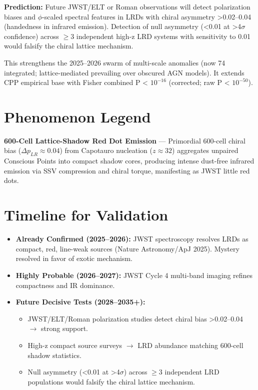 \documentclass[11pt]{article}
\begin{document}
\textbf{Prediction:} Future JWST/ELT or Roman observations will detect polarization biases and $\phi$-scaled spectral features in LRDs with chiral asymmetry >0.02--0.04 (handedness in infrared emission). Detection of null asymmetry (<0.01 at >4$\sigma$ confidence) across $\geq 3$ independent high-z LRD systems with sensitivity to 0.01 would falsify the chiral lattice mechanism.

This strengthens the 2025--2026 swarm of multi-scale anomalies (now 74 integrated; lattice-mediated prevailing over obscured AGN models). It extends CPP empirical base with Fisher combined P < $10^{-16}$ (corrected; raw P < $10^{-50}$).

\section{Phenomenon Legend}
\textbf{600-Cell Lattice-Shadow Red Dot Emission} — Primordial 600-cell chiral bias ($\Delta p_{LR} \approx 0.04$) from Capotauro nucleation ($z \approx 32$) aggregates unpaired Conscious Points into compact shadow cores, producing intense dust-free infrared emission via SSV compression and chiral torque, manifesting as JWST little red dots.

\section{Timeline for Validation}
\begin{itemize}
    \item \textbf{Already Confirmed (2025--2026):} JWST spectroscopy resolves LRDs as compact, red, line-weak sources (Nature Astronomy/ApJ 2025). Mystery resolved in favor of exotic mechanism.
    \item \textbf{Highly Probable (2026--2027):} JWST Cycle 4 multi-band imaging refines compactness and IR dominance.
    \item \textbf{Future Decisive Tests (2028--2035+):}
    \begin{itemize}
        \item JWST/ELT/Roman polarization studies detect chiral bias >0.02--0.04 $\to$ strong support.
        \item High-z compact source surveys $\to$ LRD abundance matching 600-cell shadow statistics.
        \item Null asymmetry (<0.01 at >4$\sigma$) across $\geq 3$ independent LRD populations would falsify the chiral lattice mechanism.
    \end{itemize}
\end{itemize}
\end{document}
